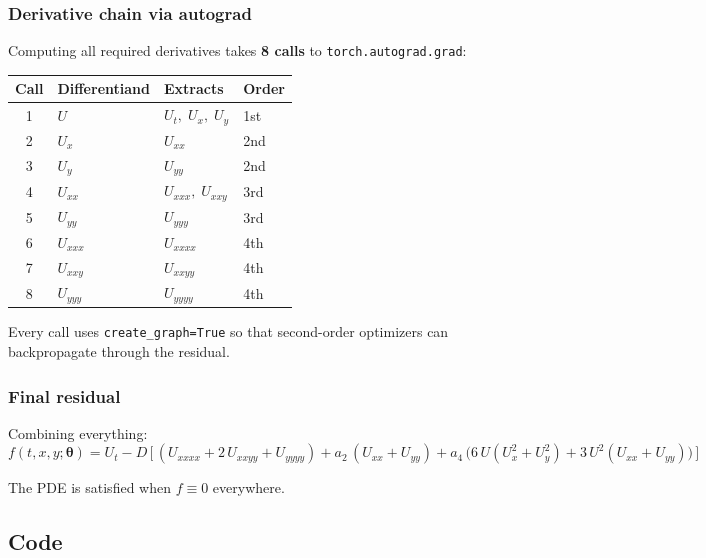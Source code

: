 \documentclass[11pt,a4paper]{article}
\begin{document}
\subsubsection*{Derivative chain via autograd}

Computing all required derivatives takes \textbf{8 calls} to
\texttt{torch.autograd.grad}:

\begin{center}
\renewcommand{\arraystretch}{1.3}
\begin{tabular}{@{}clll@{}}
\toprule
\textbf{Call} & \textbf{Differentiand} & \textbf{Extracts} & \textbf{Order} \\
\midrule
1 & $U$     & $U_t,\; U_x,\; U_y$      & 1st \\
2 & $U_x$   & $U_{xx}$                  & 2nd \\
3 & $U_y$   & $U_{yy}$                  & 2nd \\
4 & $U_{xx}$ & $U_{xxx},\; U_{xxy}$     & 3rd \\
5 & $U_{yy}$ & $U_{yyy}$                & 3rd \\
6 & $U_{xxx}$ & $U_{xxxx}$              & 4th \\
7 & $U_{xxy}$ & $U_{xxyy}$             & 4th \\
8 & $U_{yyy}$ & $U_{yyyy}$              & 4th \\
\bottomrule
\end{tabular}
\end{center}

Every call uses \texttt{create\_graph=True} so that second-order
optimizers can backpropagate through the residual.

\subsubsection*{Final residual}

Combining everything:
\begin{equation}
\boxed{
  f(t,x,y;\bm\theta)
  = U_t - D\,\bigl[\,
    (U_{xxxx} + 2\,U_{xxyy} + U_{yyyy})
    + a_2\,(U_{xx} + U_{yy})
    + a_4\,\bigl(6\,U(U_x^2 + U_y^2) + 3\,U^2(U_{xx} + U_{yy})\bigr)
  \,\bigr]
}
\label{eq:residual}
\end{equation}

The PDE is satisfied when $f \equiv 0$ everywhere.

\subsection*{Code}
\end{document}

